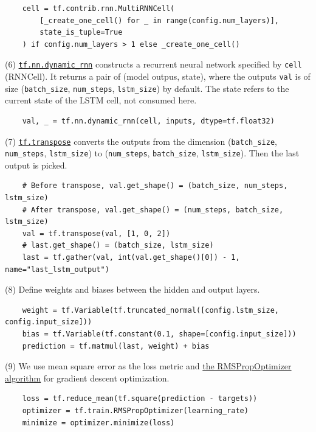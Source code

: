 \begin{verbatim}
    cell = tf.contrib.rnn.MultiRNNCell(
        [_create_one_cell() for _ in range(config.num_layers)], 
        state_is_tuple=True
    ) if config.num_layers > 1 else _create_one_cell()
\end{verbatim}

(6) \href{https://www.tensorflow.org/api_docs/python/tf/nn/dynamic_rnn}{\texttt{tf.nn.dynamic\_rnn}} constructs a recurrent neural network specified by \texttt{cell} (RNNCell). It returns a pair of (model outpus, state), where the outputs \texttt{val} is of size (\texttt{batch\_size}, \texttt{num\_steps}, \texttt{lstm\_size}) by default. The state refers to the current state of the LSTM cell, not consumed here.

\begin{verbatim}
    val, _ = tf.nn.dynamic_rnn(cell, inputs, dtype=tf.float32)
\end{verbatim}

(7) \href{https://www.tensorflow.org/api_docs/python/tf/transpose}{\texttt{tf.transpose}} converts the outputs from the dimension (\texttt{batch\_size}, \texttt{num\_steps}, \texttt{lstm\_size}) to (\texttt{num\_steps}, \texttt{batch\_size}, \texttt{lstm\_size}). Then the last output is picked.

\begin{verbatim}
    # Before transpose, val.get_shape() = (batch_size, num_steps, lstm_size)
    # After transpose, val.get_shape() = (num_steps, batch_size, lstm_size)
    val = tf.transpose(val, [1, 0, 2])
    # last.get_shape() = (batch_size, lstm_size)
    last = tf.gather(val, int(val.get_shape()[0]) - 1, name="last_lstm_output")
\end{verbatim}

(8) Define weights and biases between the hidden and output layers.

\begin{verbatim}
    weight = tf.Variable(tf.truncated_normal([config.lstm_size, config.input_size]))
    bias = tf.Variable(tf.constant(0.1, shape=[config.input_size]))
    prediction = tf.matmul(last, weight) + bias
\end{verbatim}

(9) We use mean square error as the loss metric and \href{http://www.cs.toronto.edu/~tijmen/csc321/slides/lecture_slides_lec6.pdf}{the RMSPropOptimizer algorithm} for gradient descent optimization.

\begin{verbatim}
    loss = tf.reduce_mean(tf.square(prediction - targets))
    optimizer = tf.train.RMSPropOptimizer(learning_rate)
    minimize = optimizer.minimize(loss)
\end{verbatim}


